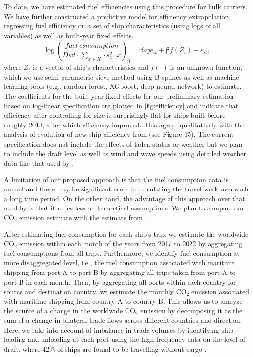 \documentclass[hidelinks, 12pt,letterpaper]{article}
\begin{document}
To date, we have estimated fuel efficiencies using this procedure for bulk carriers. We have further constructed a predictive model for efficiency extrapolation, regressing fuel efficiency on a set of ship characteristics (using logs of all variables) as well as built-year fixed effects.
 \begin{equation}
 \log\left(
     \frac{fuel~consumption}{Dwt \cdot \sum_{x \in X}  \cdot s_x^2 \cdot x}
 \right)_{it}
         = \delta age_{it} + \boldsymbol{\beta}f(Z_i) + \varepsilon_{it},
 \end{equation}
 where $Z_i$ is a vector of ship's characteristics and $f(\cdot)$ is an unknown function, which we use semi-parametric sieve method using B-splines as well as machine learning tools (e.g., random forest, XGboost, deep neural network) to estimate.
The coefficients for the built-year fixed effects for our preliminary estimation based on log-linear specification are plotted in \autoref{fig:efficiency} and indicate that efficiency after controlling for size is surprisingly flat for ships built before roughly 2013, after which efficiency improved. This agrees qualitatively with the analysis of evolution of new ship efficiency from \citet{faber2015historical} (see Figure 15). The current specification does not include the effects of laden status or weather but we plan to include  the draft level as well as wind and wave speeds using detailed weather data like that used by \citet{brancaccio2020geography}.  %

A limitation of our proposed approach is that the fuel consumption data is annual and there may be significant error in calculating the travel work over such a long time period. On the other hand, the advantage of this approach over that used by \citet{faber2020fourth} is that it relies less on theoretical assumptions. We plan to compare our CO$_2$ emission estimate with the estimate from \citet{faber2020fourth}. %

After estimating fuel consumption for each ship's trip, we estimate the worldwide CO$_2$ emission within each month of the years from 2017 to 2022 by aggregating fuel consumptions from all trips. Furthermore, we identify fuel consumption at more disaggregated level, i.e., the fuel consumption associated with maritime shipping from port A to port B by aggregating all trips taken from port A to port B in each month.  Then, by aggregating all ports within each country for source and destination country, we estimate the monthly CO$_2$ emission associated with maritime shipping from country A to country B. 
This allows us to analyze the source of  a change in the worldwide CO$_2$ emission by decomposing it as the sum of a change in bilateral trade flows across different countries and direction. 
Here, we take into account of imbalance in trade volumes by identifying ship loading and unloading at each port using the high frequency data on the level of draft, where 42\% of ships are found to be travelling without cargo \citep{brancaccio2020geography}.
  
\end{document}
